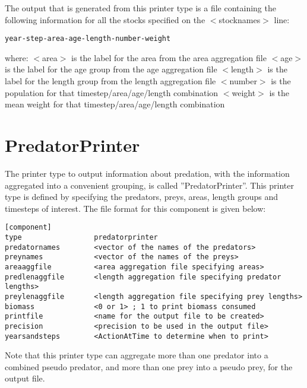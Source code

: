 \documentclass[10pt,twoside]{book}
\begin{document}
\bigskip
The output that is generated from this printer type is a file containing the following information for all the stocks specified on the $<$stocknames$>$ line:

{\small\begin{verbatim}
year-step-area-age-length-number-weight
\end{verbatim}}

where:\newline
$<$area$>$ is the label for the area from the area aggregation file\newline
$<$age$>$ is the label for the age group from the age aggregation file\newline
$<$length$>$ is the label for the length group from the length aggregation file\newline
$<$number$>$ is the population for that timestep/area/age/length combination\newline
$<$weight$>$ is the mean weight for that timestep/area/age/length combination

\section{PredatorPrinter}\label{sec:predatorprinter}
The printer type to output information about predation, with the information aggregated into a convenient grouping, is called ''PredatorPrinter''.  This printer type is defined by specifying the predators, preys, areas, length groups and timesteps of interest.  The file format for this component is given below:

{\small\begin{verbatim}
[component]
type                 predatorprinter
predatornames        <vector of the names of the predators>
preynames            <vector of the names of the preys>
areaaggfile          <area aggregation file specifying areas>
predlenaggfile       <length aggregation file specifying predator lengths>
preylenaggfile       <length aggregation file specifying prey lengths>
biomass              <0 or 1> ; 1 to print biomass consumed
printfile            <name for the output file to be created>
precision            <precision to be used in the output file>
yearsandsteps        <ActionAtTime to determine when to print>
\end{verbatim}}

Note that this printer type can aggregate more than one predator into a combined pseudo predator, and more than one prey into a pseudo prey, for the output file.
\end{document}
